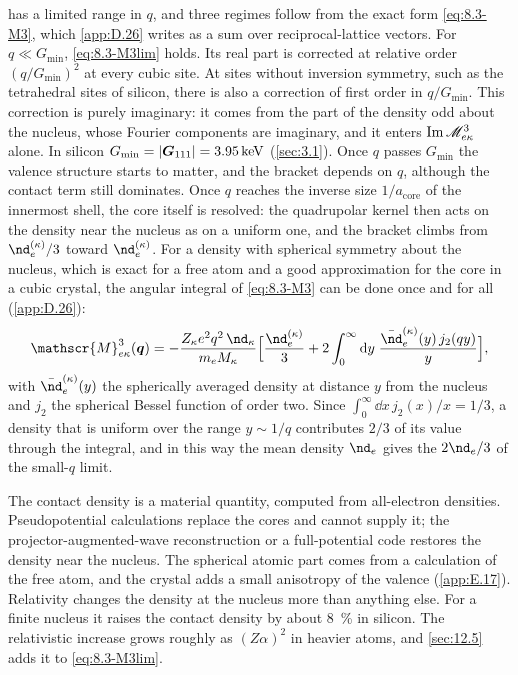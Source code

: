  has a limited range in $q$, and three regimes follow from the exact form \cref{eq:8.3-M3}, which \cref{app:D.26} writes as a sum over reciprocal-lattice vectors. For $q \ll G_{\mathrm{min}}$, \cref{eq:8.3-M3lim} holds. Its real part is corrected at relative order $(q/G_{\mathrm{min}})^2$ at every cubic site. At sites without inversion symmetry, such as the tetrahedral sites of silicon, there is also a correction of first order in $q/G_{\mathrm{min}}$. This correction is purely imaginary: it comes from the part of the density odd about the nucleus, whose Fourier components are imaginary, and it enters $\operatorname{Im}\mathscr{M}^3_{e\kappa}$ alone. In silicon $G_{\mathrm{min}} = |\bm{G}_{111}| = \SI{3.95}{keV}$ (\cref{sec:3.1}). Once $q$ passes $G_{\mathrm{min}}$ the valence structure starts to matter, and the bracket depends on $q$, although the contact term still dominates. Once $q$ reaches the inverse size $1/a_{\mathrm{core}}$ of the innermost shell, the core itself is resolved: the quadrupolar kernel then acts on the density near the nucleus as on a uniform one, and the bracket climbs from $\nd_e^{(\kappa)}/3$ toward $\nd_e^{(\kappa)}$. For a density with spherical symmetry about the nucleus, which is exact for a free atom and a good approximation for the core in a cubic crystal, the angular integral of \cref{eq:8.3-M3} can be done once and for all (\cref{app:D.26}):
\begin{equation}
  \mathscr{M}^3_{e\kappa}(\vect{q}) = -\frac{Z_\kappa e^2q^2\,\nd_\kappa}{m_eM_\kappa}\Bigl[\frac{\nd_e^{(\kappa)}}{3} + 2\int_0^\infty\dd y\;\frac{\bar\nd_e^{(\kappa)}(y)\,j_2(qy)}{y}\Bigr] ,
  \label{eq:8.3-M3sph}
\end{equation}
with $\bar\nd_e^{(\kappa)}(y)$ the spherically averaged density at distance $y$ from the nucleus and $j_2$ the spherical Bessel function of order two. Since $\int_0^\infty\dd x\,j_2(x)/x = 1/3$, a density that is uniform over the range $y \sim 1/q$ contributes $2/3$ of its value through the integral, and in this way the mean density $\nd_e$ gives the $2\nd_e/3$ of the small-$q$ limit.

The contact density is a material quantity, computed from all-electron densities. Pseudopotential calculations replace the cores and cannot supply it; the projector-augmented-wave reconstruction or a full-potential code restores the density near the nucleus. The spherical atomic part comes from a calculation of the free atom, and the crystal adds a small anisotropy of the valence (\cref{app:E.17}). Relativity changes the density at the nucleus more than anything else. For a finite nucleus it raises the contact density by about \SI{8}{\percent} in silicon. The relativistic increase grows roughly as $(Z\alpha)^2$ in heavier atoms, and \cref{sec:12.5} adds it to \cref{eq:8.3-M3lim}.

